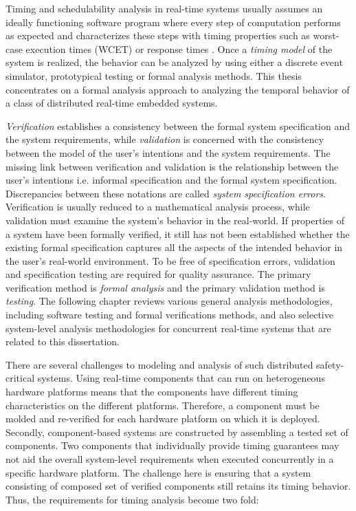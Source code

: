 Timing and schedulability analysis in real-time systems usually assumes an ideally functioning software program where every step of computation performs as expected and characterizes these steps with timing properties such as worst-case execution times (WCET) \cite{wilhelm2008worst} or response times \cite{joseph1986finding}. Once a \emph{timing model} of the system is realized, the behavior can be analyzed by using either a discrete event simulator, prototypical testing or formal analysis methods. This thesis concentrates on a formal analysis approach to analyzing the temporal behavior of a class of distributed real-time embedded systems.

\emph{Verification} establishes a consistency between the formal system specification and the system requirements, while \emph{validation} is concerned with the consistency between the model of the user's intentions and the system requirements. The missing link between verification and validation is the relationship between the user's intentions i.e. informal specification and the formal system specification. Discrepancies between these notations are called \emph{system specification errors}. Verification is usually reduced to a mathematical analysis process, while validation must examine the system's behavior in the real-world. If properties of a system have been formally verified, it still has not been established whether the existing formal specification captures all the aspects of the intended behavior in the user's real-world environment. To be free of specification errors, validation and specification testing are required for quality assurance. The primary verification method is \emph{formal analysis} and the primary validation method is \emph{testing}. The following chapter reviews various general analysis methodologies, including software testing and formal verifications methods, and also selective system-level analysis methodologies for concurrent real-time systems that are related to this dissertation. 


There are several challenges to modeling and analysis of such distributed safety-critical systems. Using real-time components that can run on heterogeneous hardware platforms means that the components have different timing characteristics on the different platforms. Therefore, a component must be molded and re-verified for each hardware platform on which it is deployed. Secondly, component-based systems are constructed by assembling a tested set of components. Two components that individually provide timing guarantees may not aid the overall system-level requirements when executed concurrently in a specific hardware platform. The challenge here is ensuring that a system consisting of composed set of verified components still retains its timing behavior. Thus, the requirements for timing analysis become two fold: 


